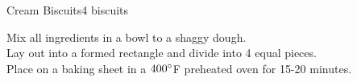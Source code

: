 \begin{recipe}{Cream Biscuits}{4 biscuits}{}


    Mix all ingredients in a bowl to a shaggy dough.\\

    Lay out into a formed rectangle and divide into 4 equal pieces.\\

    Place on a baking sheet in a $400\degree$F preheated oven for 15-20 minutes.
\end{recipe}